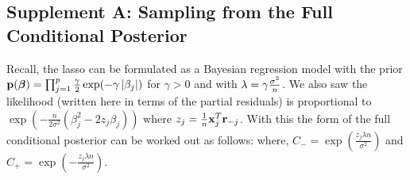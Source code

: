 \subsection{Supplement A: Sampling from the Full Conditional Posterior}\label{Sup:A}


Recall, the lasso can be formulated as a Bayesian regression model with the prior $\mathbf{p}(\boldsymbol{\beta}) = \prod_{j = 1}^{p} \frac{\gamma}{2}\exp(-\gamma \left\lvert\beta_j\right\rvert)$ for $\gamma > 0$ and with $\lambda = \gamma \frac{\sigma^2}{n}$. We also saw the likelihood (written here in terms of the partial residuals) is proportional to $\exp(-\frac{n}{2\sigma^2} (\beta_j^2 - 2z_j\beta_j))$ where $z_{j} = \frac{1}{n} \mathbf{x}_{j}^{T}\mathbf{r}_{-j}$.  With this the form of the full conditional posterior can be worked out as follows:
where, $C_{-} = \exp(\frac{z_j \lambda n}{\sigma^2})$ and $C_{+} = \exp(-\frac{z_j \lambda n}{\sigma^2})$.

